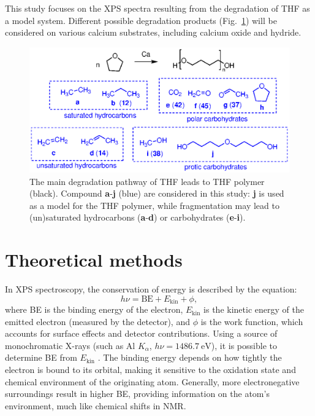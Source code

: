 \documentclass[12pt,a4paper]{article}
\begin{document}
This study focuses on the XPS spectra resulting from the degradation of THF as a model system. Different possible degradation products (Fig.~\ref{fig:THFdegradation}) will be considered on various calcium substrates, including calcium oxide and hydride.

\begin{figure}
	\centering
	\includegraphics{Figure1}
	\caption{The main degradation pathway of THF leads to THF polymer (black). Compound \textbf{a}-\textbf{j} (blue) are considered in this study: \textbf{j} is used as a model for the THF polymer, while fragmentation may lead to (un)saturated hydrocarbons (\textbf{a}-\textbf{d}) or carbohydrates (\textbf{e}-\textbf{i}).}
	\label{fig:THFdegradation}
\end{figure}

\section{Theoretical methods}

In XPS spectroscopy, the conservation of energy is described by the equation:
\begin{equation}
	h\nu = \text{BE} + E_{\text{kin}} + \phi, \label{eq:xps}
\end{equation}
where BE is the binding energy of the electron, $E_{\text{kin}}$ is the kinetic energy of the emitted electron (measured by the detector), and $\phi$ is the work function, which accounts for surface effects and detector contributions. Using a source of monochromatic X-rays (such as Al $K_\alpha$, $h\nu = \SI{1486.7}{\electronvolt}$), it is possible to determine BE from $E_{\text{kin}}$ \cite{vinesPredictionCoreLevel2018}. The binding energy depends on how tightly the electron is bound to its orbital, making it sensitive to the oxidation state and chemical environment of the originating atom. Generally, more electronegative surroundings result in higher BE, providing information on the atom's environment, much like chemical shifts in NMR.
\end{document}
